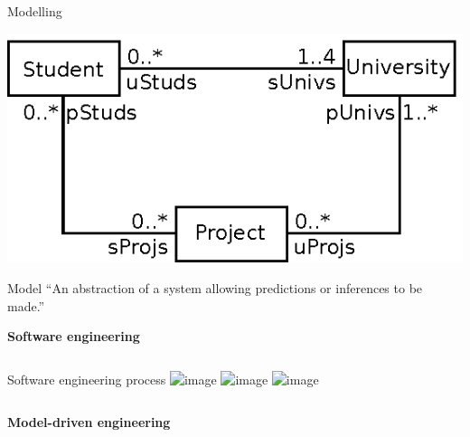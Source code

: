\documentclass[dvips,slidetop,mathserif,red]{beamer}
\begin{document}
\begin{frame}{Modelling}
  \begin{center}
    \includegraphics{ex_project_uml_class_3}
  \end{center}
\end{frame}

\begin{frame}{Model}
  ``An abstraction of a system allowing predictions or inferences to be made.''
\end{frame}

\begin{frame}{}
  \begin{center}
    \begin{Huge}
      \textbf{Software engineering}
    \end{Huge}
  \end{center}
\end{frame}

\begin{frame}{}
  \begin{columns}[T]
    \begin{block}{Software engineering process}
      \includegraphics<1>{process_se_1}
      \includegraphics<2>{process_se_2}
      \includegraphics<3>{process_se_3}
    \end{block}
  \end{columns}
\end{frame}

\begin{frame}{}
  \begin{center}
    \begin{Huge}
      \textbf{Model-driven engineering}
    \end{Huge}
  \end{center}
\end{frame}
\end{document}
